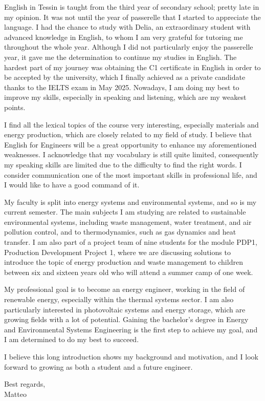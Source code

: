 \documentclass{article}
\begin{document}
English in Tessin is taught from the third year of secondary school; pretty late in my opinion.
It was not until the year of passerelle that I started to appreciate the language. I had
the chance to study with Delia, an extraordinary student with advanced knowledge in English,
to whom I am very grateful for tutoring me throughout the whole year.
Although I did not particularly enjoy the passerelle year, it gave me the determination to
continue my studies in English.
The hardest part of my journey was obtaining the C1 certificate in English in order
to be accepted by the university, which I finally achieved as a private candidate thanks to
the IELTS exam in May 2025.
Nowadays, I am doing my best to improve my skills, especially in speaking and listening,
which are my weakest points.

I find all the lexical topics of the course very interesting, especially materials and
energy production, which are closely related to my field of study.
I believe that English for Engineers will be a great opportunity to enhance my
aforementioned weaknesses.
I acknowledge that my vocabulary is still quite limited, consequently my speaking skills
are limited due to the difficulty to find the right words. I consider communication one of
the most important skills in professional life, and I would like to have a good command of it.

My faculty is split into energy systems and environmental systems, and so is my current
semester. The main subjects I am studying are related to sustainable environmental
systems, including waste management, water treatment, and air pollution control, and
to thermodynamics, such as gas dynamics and heat transfer.
I am also part of a project team of nine students for the module PDP1, Production
Development Project 1, where we are discussing solutions to introduce the topic of
energy production and waste management to children between six and sixteen years old who
will attend a summer camp of one week.

My professional goal is to become an energy engineer, working in the field of renewable
energy, especially within the thermal systems sector. I am also particularly interested
in photovoltaic systems and energy storage, which are growing fields with a lot of
potential.
Gaining the bachelor's degree in Energy and Environmental Systems Engineering is the first
step to achieve my goal, and I am determined to do my best to succeed.

I believe this long introduction shows my background and motivation, and I look forward
to growing as both a student and a future engineer.
\setlength{\parskip}{1.5em}

Best regards,\\
Matteo
\end{document}
